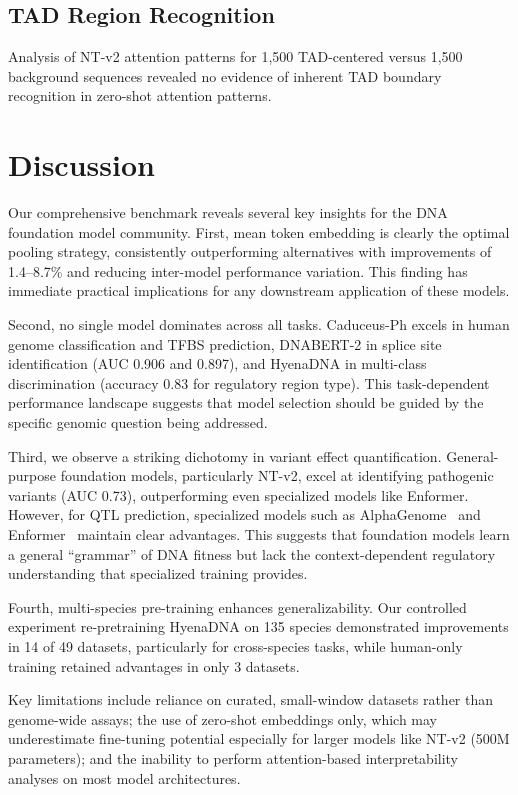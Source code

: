 \documentclass[11pt]{article}
\begin{document}
\subsection{TAD Region Recognition}

Analysis of NT-v2 attention patterns for 1,500 TAD-centered versus 1,500 background sequences revealed no evidence of inherent TAD boundary recognition in zero-shot attention patterns.

\section{Discussion}

Our comprehensive benchmark reveals several key insights for the DNA foundation model community. First, mean token embedding is clearly the optimal pooling strategy, consistently outperforming alternatives with improvements of 1.4--8.7\% and reducing inter-model performance variation. This finding has immediate practical implications for any downstream application of these models.

Second, no single model dominates across all tasks. Caduceus-Ph excels in human genome classification and TFBS prediction, DNABERT-2 in splice site identification (AUC 0.906 and 0.897), and HyenaDNA in multi-class discrimination (accuracy 0.83 for regulatory region type). This task-dependent performance landscape suggests that model selection should be guided by the specific genomic question being addressed.

Third, we observe a striking dichotomy in variant effect quantification. General-purpose foundation models, particularly NT-v2, excel at identifying pathogenic variants (AUC 0.73), outperforming even specialized models like Enformer. However, for QTL prediction, specialized models such as AlphaGenome~\citep{cheng2024alphagenome} and Enformer~\citep{avsec2021effective} maintain clear advantages. This suggests that foundation models learn a general ``grammar'' of DNA fitness but lack the context-dependent regulatory understanding that specialized training provides.

Fourth, multi-species pre-training enhances generalizability. Our controlled experiment re-pretraining HyenaDNA on 135 species demonstrated improvements in 14 of 49 datasets, particularly for cross-species tasks, while human-only training retained advantages in only 3 datasets.

Key limitations include reliance on curated, small-window datasets rather than genome-wide assays; the use of zero-shot embeddings only, which may underestimate fine-tuning potential especially for larger models like NT-v2 (500M parameters); and the inability to perform attention-based interpretability analyses on most model architectures.
\end{document}
